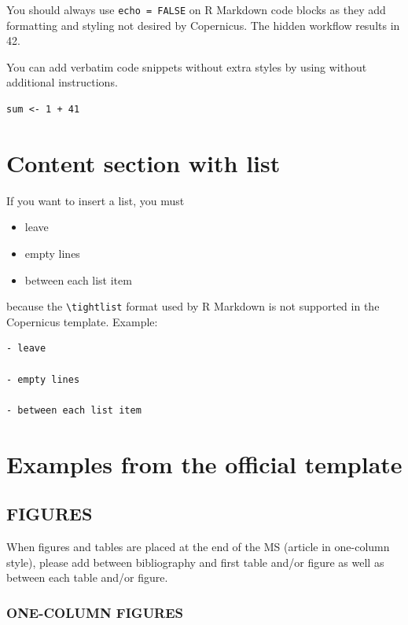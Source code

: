\documentclass[, manuscript]{copernicus}
\begin{document}
You should always use \texttt{echo\ =\ FALSE} on R Markdown code blocks
as they add formatting and styling not desired by Copernicus. The hidden
workflow results in 42.

You can add verbatim code snippets without extra styles by using
\texttt{\textasciigrave{}\textasciigrave{}\textasciigrave{}} without
additional instructions.

\begin{verbatim}
sum <- 1 + 41
\end{verbatim}

\section{Content section with list}

If you want to insert a list, you must

\begin{itemize}
\item
  leave
\item
  empty lines
\item
  between each list item
\end{itemize}

because the \texttt{\textbackslash{}tightlist} format used by R Markdown
is not supported in the Copernicus template. Example:

\begin{verbatim}
- leave

- empty lines

- between each list item
\end{verbatim}

\section{Examples from the official template}

\subsection{FIGURES}

When figures and tables are placed at the end of the MS (article in
one-column style), please add \clearpage between bibliography and first
table and/or figure as well as between each table and/or figure.

\subsubsection{ONE-COLUMN FIGURES}
\end{document}
